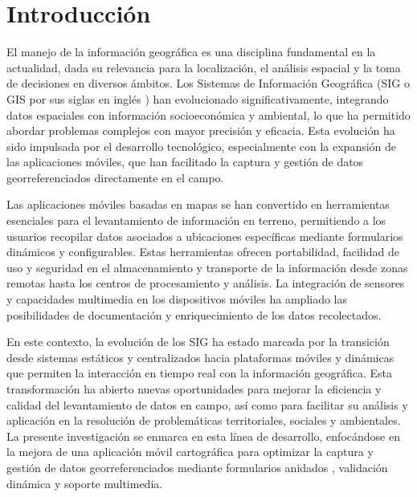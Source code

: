 \documentclass{article}
\date{}
\begin{document}
\section{Introducción}\label{introducciuxf3n}

El manejo de la información geográfica es una disciplina fundamental en la actualidad, dada su relevancia para la localización, el análisis espacial y la toma de decisiones en diversos ámbitos. Los Sistemas de Información Geográfica (SIG o GIS por sus siglas en inglés \cite{sarria2020}) han evolucionado significativamente, integrando datos espaciales con información socioeconómica y ambiental, lo que ha permitido abordar problemas complejos con mayor precisión y eficacia. Esta evolución ha sido impulsada por el desarrollo tecnológico, especialmente con la expansión de las aplicaciones móviles, que han facilitado la captura y gestión de datos georreferenciados directamente en el campo.

Las aplicaciones móviles basadas en mapas se han convertido en herramientas esenciales para el levantamiento de información en terreno, permitiendo a los usuarios recopilar datos asociados a ubicaciones específicas mediante formularios dinámicos y configurables. Estas herramientas ofrecen portabilidad, facilidad de uso y seguridad en el almacenamiento y transporte de la información desde zonas remotas hasta los centros de procesamiento y análisis. La integración de sensores y capacidades multimedia en los dispositivos móviles ha ampliado las posibilidades de documentación y enriquecimiento de los datos recolectados.

En este contexto, la evolución de los SIG ha estado marcada por la transición desde sistemas estáticos y centralizados hacia plataformas móviles y dinámicas que permiten la interacción en tiempo real con la información geográfica. Esta transformación ha abierto nuevas oportunidades para mejorar la eficiencia y calidad del levantamiento de datos en campo, así como para facilitar su análisis y aplicación en la resolución de problemáticas territoriales, sociales y ambientales. La presente investigación se enmarca en esta línea de desarrollo, enfocándose en la mejora de una aplicación móvil cartográfica para optimizar la captura y gestión de datos georreferenciados mediante formularios anidados \cite{ceri1984}, validación dinámica y soporte multimedia.
\end{document}
